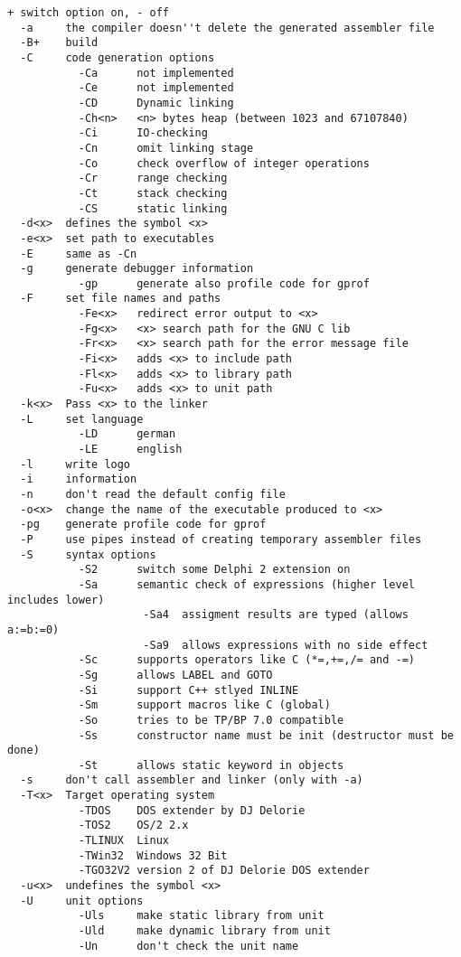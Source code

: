 \documentclass{report}
\begin{document}
\begin{verbatim}
+ switch option on, - off
  -a     the compiler doesn''t delete the generated assembler file
  -B+    build
  -C     code generation options
           -Ca      not implemented
           -Ce      not implemented
           -CD      Dynamic linking
           -Ch<n>   <n> bytes heap (between 1023 and 67107840)
           -Ci      IO-checking
           -Cn      omit linking stage
           -Co      check overflow of integer operations
           -Cr      range checking
           -Ct      stack checking
           -CS      static linking
  -d<x>  defines the symbol <x>
  -e<x>  set path to executables
  -E     same as -Cn
  -g     generate debugger information
           -gp      generate also profile code for gprof
  -F     set file names and paths
           -Fe<x>   redirect error output to <x>
           -Fg<x>   <x> search path for the GNU C lib
           -Fr<x>   <x> search path for the error message file
           -Fi<x>   adds <x> to include path
           -Fl<x>   adds <x> to library path
           -Fu<x>   adds <x> to unit path
  -k<x>  Pass <x> to the linker
  -L     set language
           -LD      german
           -LE      english
  -l     write logo
  -i     information
  -n     don't read the default config file
  -o<x>  change the name of the executable produced to <x>
  -pg    generate profile code for gprof
  -P     use pipes instead of creating temporary assembler files
  -S     syntax options
           -S2      switch some Delphi 2 extension on
           -Sa      semantic check of expressions (higher level includes lower)
                     -Sa4  assigment results are typed (allows a:=b:=0)
                     -Sa9  allows expressions with no side effect
           -Sc      supports operators like C (*=,+=,/= and -=)
           -Sg      allows LABEL and GOTO
           -Si      support C++ stlyed INLINE
           -Sm      support macros like C (global)
           -So      tries to be TP/BP 7.0 compatible
           -Ss      constructor name must be init (destructor must be done)
           -St      allows static keyword in objects
  -s     don't call assembler and linker (only with -a)
  -T<x>  Target operating system
           -TDOS    DOS extender by DJ Delorie
           -TOS2    OS/2 2.x
           -TLINUX  Linux
           -TWin32  Windows 32 Bit
           -TGO32V2 version 2 of DJ Delorie DOS extender
  -u<x>  undefines the symbol <x>
  -U     unit options
           -Uls     make static library from unit
           -Uld     make dynamic library from unit
           -Un      don't check the unit name

\end{verbatim}
\end{document}
